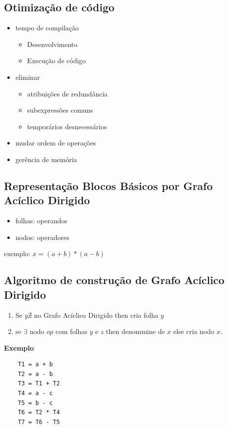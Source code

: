 \documentclass[ 12pt, a4paper]{article}
\begin{document}
	\subsection{Otimização de código}
		\begin{itemize}
			\item tempo de compilação
				\begin{itemize}
					\item Desenvolvimento
					\item Execução de código
				\end{itemize}
			\item eliminar
				\begin{itemize}
					\item atribuições de redundância
					\item subexpressões comuns
					\item temporários desnecessários
				\end{itemize}
			\item mudar ordem de operações
			\item gerência de memória
		\end{itemize}

	\subsection{Representação Blocos Básicos por Grafo Acíclico Dirigido}
		\begin{itemize}
			\item folhas: operandos
			\item nodos: operadores
		\end{itemize}
		exemplo: $x = (a+b) * (a-b)$

	\subsection{Algoritmo de construção de Grafo Acíclico Dirigido}
		\begin{enumerate}
			\item Se $y \nexists$ no Grafo Acíclico Dirigido then cria folha $y$
			\item se $\exists$ nodo $op$ com folhas $y$ e $z$ then denommine de $x$ else cria nodo $x$.
		\end{enumerate}
	\textbf{Exemplo}

\begin{verbatim}
	T1 = a + b
	T2 = a - b
	T3 = T1 + T2
	T4 = a - c
	T5 = b - c
	T6 = T2 * T4
	T7 = T6 - T5
\end{verbatim}
\end{document}
